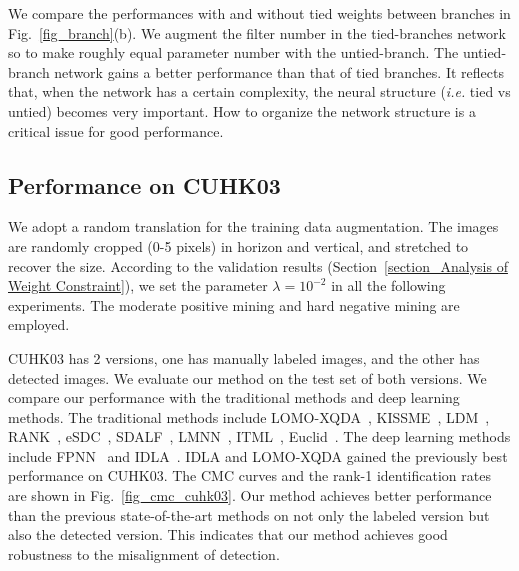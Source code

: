\documentclass[runningheads]{llncs}
\begin{document}
\begin{figure*}[!h]
  \centering
  \hspace{2pt}


  \caption{(a) The learned filters of the first convolutional layer. The top, middle and bottom lines correspond to the 3 branches in the proposed CNN. Best viewed in color.
  (b) The performances with and without tied weights between branches.}
  \label{fig_branch}
\end{figure*}

We compare the performances with and without tied weights between branches in Fig.~\ref{fig_branch}(b). We augment the filter number in the tied-branches network so to make roughly equal parameter number with the untied-branch.
The untied-branch network gains a better performance than that of tied branches.
It reflects that, when the network has a certain complexity, the neural structure (\emph{i.e.} tied vs untied) becomes very important.
How to organize the network structure is a critical issue for good performance.





\subsection{Performance on CUHK03}
\label{section_Performance on CUHK03}
We adopt a random translation for the training data augmentation.
The images are randomly cropped (0-5 pixels) in horizon and vertical, and stretched to recover the size.
According to the validation results (Section~\ref{section_Analysis of Weight Constraint}), we set the parameter $\lambda = 10^{-2}$ in all the following experiments.
The moderate positive mining and hard negative mining are employed.

CUHK03 has 2 versions, one has manually labeled images, and the other has detected images. We evaluate our method on the test set of both versions.
We compare our performance with the traditional methods and deep learning methods. The traditional methods include LOMO-XQDA~\cite{liao2015person}, KISSME~\cite{koestinger2012large}, LDM~\cite{guillaumin2009you}, RANK~\cite{mcfee2010metric}, eSDC~\cite{zhao2013unsupervised}, SDALF~\cite{farenzena2010person}, LMNN~\cite{weinberger2005distance}, ITML~\cite{davis2007information}, Euclid~\cite{zhao2013unsupervised}. The deep learning methods include FPNN~\cite{li2014deepreid} and IDLA~\cite{ahmed2015improved}. IDLA and LOMO-XQDA gained the previously best performance on CUHK03.
The CMC curves and the rank-1 identification rates are shown in Fig.~\ref{fig_cmc_cuhk03}.
Our method achieves better performance than the previous state-of-the-art methods on not only the labeled version but also the detected version.
This indicates that our method achieves good robustness to the misalignment of detection.
\end{document}
